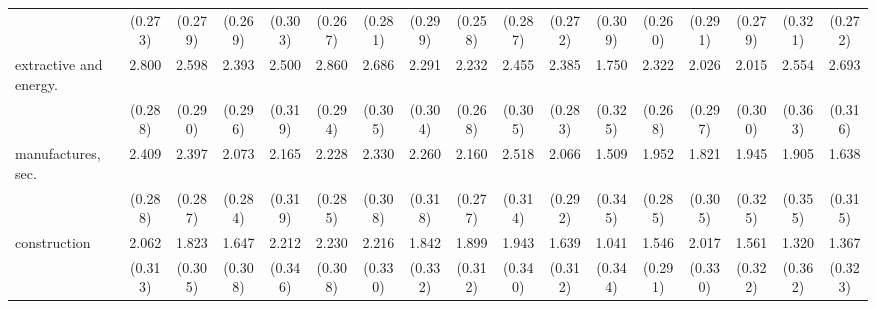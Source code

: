 {\begin{tabular}{l*{16}{c}}
                    &     (0.273)         &     (0.279)         &     (0.269)         &     (0.303)         &     (0.267)         &     (0.281)         &     (0.299)         &     (0.258)         &     (0.287)         &     (0.272)         &     (0.309)         &     (0.260)         &     (0.291)         &     (0.279)         &     (0.321)         &     (0.272)         \\
[1em]
extractive and energy.&       2.800\sym{***}&       2.598\sym{***}&       2.393\sym{***}&       2.500\sym{***}&       2.860\sym{***}&       2.686\sym{***}&       2.291\sym{***}&       2.232\sym{***}&       2.455\sym{***}&       2.385\sym{***}&       1.750\sym{***}&       2.322\sym{***}&       2.026\sym{***}&       2.015\sym{***}&       2.554\sym{***}&       2.693\sym{***}\\
                    &     (0.288)         &     (0.290)         &     (0.296)         &     (0.319)         &     (0.294)         &     (0.305)         &     (0.304)         &     (0.268)         &     (0.305)         &     (0.283)         &     (0.325)         &     (0.268)         &     (0.297)         &     (0.300)         &     (0.363)         &     (0.316)         \\
[1em]
manufactures, sec.  &       2.409\sym{***}&       2.397\sym{***}&       2.073\sym{***}&       2.165\sym{***}&       2.228\sym{***}&       2.330\sym{***}&       2.260\sym{***}&       2.160\sym{***}&       2.518\sym{***}&       2.066\sym{***}&       1.509\sym{***}&       1.952\sym{***}&       1.821\sym{***}&       1.945\sym{***}&       1.905\sym{***}&       1.638\sym{***}\\
                    &     (0.288)         &     (0.287)         &     (0.284)         &     (0.319)         &     (0.285)         &     (0.308)         &     (0.318)         &     (0.277)         &     (0.314)         &     (0.292)         &     (0.345)         &     (0.285)         &     (0.305)         &     (0.325)         &     (0.355)         &     (0.315)         \\
[1em]
construction        &       2.062\sym{***}&       1.823\sym{***}&       1.647\sym{***}&       2.212\sym{***}&       2.230\sym{***}&       2.216\sym{***}&       1.842\sym{***}&       1.899\sym{***}&       1.943\sym{***}&       1.639\sym{***}&       1.041\sym{**} &       1.546\sym{***}&       2.017\sym{***}&       1.561\sym{***}&       1.320\sym{***}&       1.367\sym{***}\\
                    &     (0.313)         &     (0.305)         &     (0.308)         &     (0.346)         &     (0.308)         &     (0.330)         &     (0.332)         &     (0.312)         &     (0.340)         &     (0.312)         &     (0.344)         &     (0.291)         &     (0.330)         &     (0.322)         &     (0.362)         &     (0.323)         \\

\end{tabular}}
